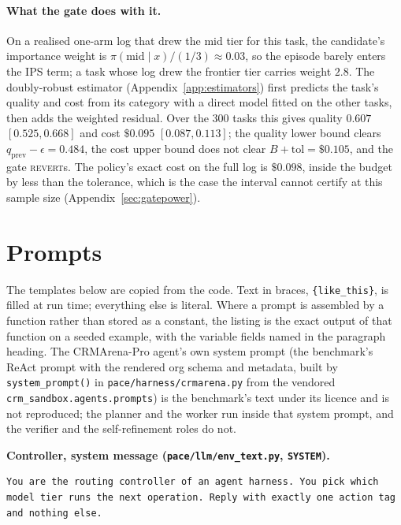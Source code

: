 \documentclass[10pt]{article}
\newcommand{\code}[1]{\texttt{#1}}
\newcommand{\REVERT}{\textsc{revert}}
\newcommand{\prompttitle}[1]{\par\vspace{7pt}\noindent\textbf{#1}\par\nopagebreak\vspace{3pt}}
\begin{document}
\paragraph{What the gate does with it.} On a realised one-arm log that drew the mid tier for this task, the candidate's importance weight is $\pi(\text{mid}\mid x)/(1/3)\approx0.03$, so the episode barely enters the IPS term; a task whose log drew the frontier tier carries weight $2.8$. The doubly-robust estimator (Appendix~\ref{app:estimators}) first predicts the task's quality and cost from its category with a direct model fitted on the other tasks, then adds the weighted residual. Over the 300 tasks this gives quality $0.607$ $[0.525, 0.668]$ and cost $\$0.095$ $[0.087, 0.113]$; the quality lower bound clears $q_{\text{prev}}-\epsilon=0.484$, the cost upper bound does not clear $B+\mathrm{tol}=\$0.105$, and the gate \REVERT{}s. The policy's exact cost on the full log is $\$0.098$, inside the budget by less than the tolerance, which is the case the interval cannot certify at this sample size (Appendix~\ref{sec:gatepower}).

\section{Prompts}
\label{app:prompts}
The templates below are copied from the code. Text in braces, \code{\{like\_this\}}, is filled at run time; everything else is literal. Where a prompt is assembled by a function rather than stored as a constant, the listing is the exact output of that function on a seeded example, with the variable fields named in the paragraph heading. The CRMArena-Pro agent's own system prompt (the benchmark's ReAct prompt with the rendered org schema and metadata, built by \code{system\_prompt()} in \code{pace/harness/crmarena.py} from the vendored \code{crm\_sandbox.agents.prompts}) is the benchmark's text under its licence and is not reproduced; the planner and the worker run inside that system prompt, and the verifier and the self-refinement roles do not.


\prompttitle{Controller, system message (\code{pace/llm/env\_text.py}, \code{SYSTEM}).}
\begin{lstlisting}
You are the routing controller of an agent harness. You pick which model tier runs the next operation. Reply with exactly one action tag and nothing else.
\end{lstlisting}
\end{document}
